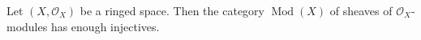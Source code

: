 Let $(X, \mathcal{O}_X)$ be a ringed space. Then the category $\operatorname{Mod}(X)$ of sheaves of $\mathcal{O}_X$-modules has enough injectives.
